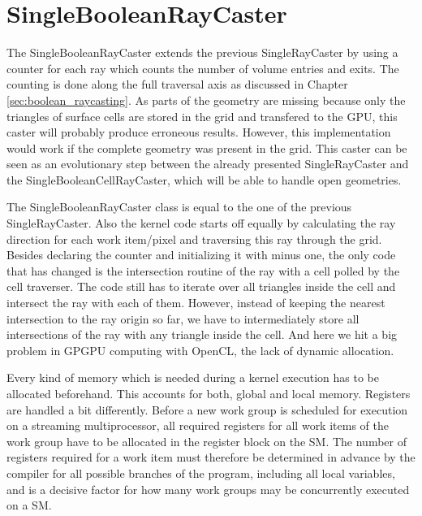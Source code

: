 \section{SingleBooleanRayCaster}
\label{sec:single_boolean}

The SingleBooleanRayCaster extends the previous SingleRayCaster by using a counter for each ray which counts the number of volume entries and exits. The counting is done along the full traversal axis as discussed in Chapter \ref{sec:boolean_raycasting}. As parts of the geometry are missing because only the triangles of surface cells are stored in the grid and transfered to the GPU, this caster will probably produce erroneous results. However, this implementation would work if the complete geometry was present in the grid. This caster can be seen as an evolutionary step between the already presented SingleRayCaster and the SingleBooleanCellRayCaster, which will be able to handle open geometries.

The SingleBooleanRayCaster class is equal to the one of the previous SingleRayCaster. Also the kernel code starts off equally by calculating the ray direction for each work item/pixel and traversing this ray through the grid. Besides declaring the counter and initializing it with minus one, the only code that has changed is the intersection routine of the ray with a cell polled by the cell traverser. The code still has to iterate over all triangles inside the cell and intersect the ray with each of them. However, instead of keeping the nearest intersection to the ray origin so far, we have to intermediately store all intersections of the ray with any triangle inside the cell. And here we hit a big problem in GPGPU computing with OpenCL, the lack of dynamic allocation.

Every kind of memory which is needed during a kernel execution has to be allocated beforehand. This accounts for both, global and local memory. Registers are handled a bit differently. Before a new work group is scheduled for execution on a streaming multiprocessor, all required registers for all work items of the work group have to be allocated in the register block on the SM. The number of registers required for a work item must therefore be determined in advance by the compiler for all possible branches of the program, including all local variables, and is a decisive factor for how many work groups may be concurrently executed on a SM.


